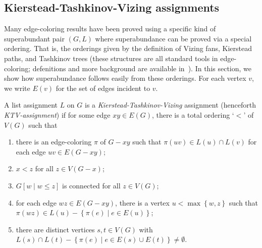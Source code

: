 \documentclass[12pt]{article}
\theoremstyle{plain}
\theoremstyle{definition}
\theoremstyle{remark}
\newcommand{\set}[1]{\left\{ #1 \right\}}
\newcommand{\setbs}[2]{\left\{ #1 \mid #2 \right\}}
\newcommand{\brackets}[1]{\left[ #1 \right]}
\begin{document}
\subsection{Kierstead-Tashkinov-Vizing assignments}
Many edge-coloring results have been proved using a specific kind of
superabundant pair $(G, L)$ where superabundance can be proved via a special
ordering. That is, the orderings given by the definition of Vizing fans,
Kierstead paths, and Tashkinov trees (these structures are all standard tools in
edge-coloring; defenitions and more background are available
in~\cite{stiebitz2012graph}).
In this section, we show how superabundance follows easily from these orderings.
For each vertex $v$, we write $E(v)$ for the set of edges incident to $v$.

A list assignment $L$ on $G$ is a \emph{Kierstead-Tashkinov-Vizing} assignment
(henceforth \emph{KTV-assignment}) if for some edge $xy \in E(G)$, there is a
total ordering `$<$' of $V(G)$ such that

\begin{enumerate}
\item there is an edge-coloring $\pi$ of $G-xy$ such that $\pi(uv) \in L(u)
\cap L(v)$ for each edge $uv \in E(G - xy)$; 
\item $x < z$ for all $z \in V(G - x)$; 
\item $G\brackets{w \mid w \le z}$ is connected for all $z \in V(G)$; 
\item for each edge $wz \in E(G - xy)$, there is a vertex $u < \max\set{w, z}$ such that
$\pi(wz) \in L(u) - \setbs{\pi(e)}{e \in E(u)}$;
\item there are distinct vertices $s, t \in V(G)$ with $L(s) \cap L(t) -
\setbs{\pi(e)}{e \in E(s) \cup E(t)} \ne \emptyset$.
\end{enumerate}
\end{document}
